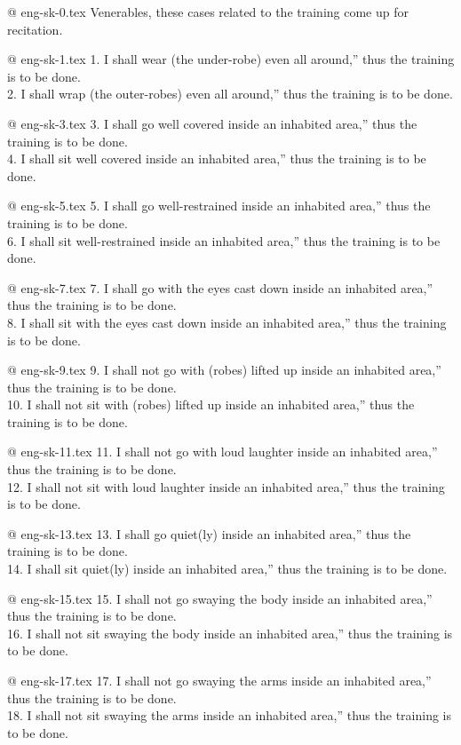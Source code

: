 @ eng-sk-0.tex
Venerables, these cases related to the training come up for recitation.

@ eng-sk-1.tex
1. I shall wear (the under-robe) even all around,” thus the training is to be done.\\
2. I shall wrap (the outer-robes) even all around,” thus the training is to be done.

@ eng-sk-3.tex
3. I shall go well covered inside an inhabited area,” thus the training is to be done.\\
4. I shall sit well covered inside an inhabited area,” thus the training is to be done.

@ eng-sk-5.tex
5. I shall go well-restrained inside an inhabited area,” thus the training is to be done.\\
6. I shall sit well-restrained inside an inhabited area,” thus the training is to be done.

@ eng-sk-7.tex
7. I shall go with the eyes cast down inside an inhabited area,” thus the training is to be done.\\
8. I shall sit with the eyes cast down inside an inhabited area,” thus the training is to be done.

@ eng-sk-9.tex
9. I shall not go with (robes) lifted up inside an inhabited area,” thus the training is to be done.\\
10. I shall not sit with (robes) lifted up inside an inhabited area,” thus the training is to be done.

@ eng-sk-11.tex
11. I shall not go with loud laughter inside an inhabited area,” thus the training is to be done.\\
12. I shall not sit with loud laughter inside an inhabited area,” thus the training is to be done.

@ eng-sk-13.tex
13. I shall go quiet(ly) inside an inhabited area,” thus the training is to be done.\\
14. I shall sit quiet(ly) inside an inhabited area,” thus the training is to be done.

@ eng-sk-15.tex
15. I shall not go swaying the body inside an inhabited area,” thus the training is to be done.\\
16. I shall not sit swaying the body inside an inhabited area,” thus the training is to be done.

@ eng-sk-17.tex
17. I shall not go swaying the arms inside an inhabited area,” thus the training is to be done.\\
18. I shall not sit swaying the arms inside an inhabited area,” thus the training is to be done.

